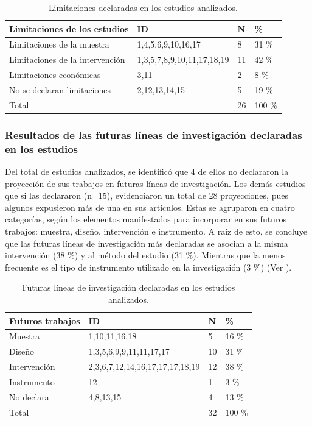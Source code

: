 \documentclass[spanish]{textolivre}
\begin{document}
\begin{table}[htbp]
\caption{Limitaciones declaradas en los estudios analizados.}
\label{tbl11}
\centering
\begin{tabular}{l l l l}
\toprule 
\textbf{Limitaciones de los estudios} & \textbf{ID} & \textbf{N} & \textbf{\%}
\\
\midrule
Limitaciones de la muestra & 1,4,5,6,9,10,16,17 & 8 & 31 \%
\\
Limitaciones de la intervención & 1,3,5,7,8,9,10,11,17,18,19 & 11 & 42 \%
\\
Limitaciones económicas & 3,11 & 2 & 8 \%
\\
No se declaran limitaciones & 2,12,13,14,15 & 5 & 19 \%
\\
Total & & 26 & 100 \%
\\
\bottomrule
\end{tabular}
\end{table}

\subsubsection{Resultados de las futuras líneas de investigación declaradas en los estudios}\label{sec-format-simple}

Del total de estudios analizados, se identificó que 4 de ellos no declararon la proyección de sus trabajos en futuras líneas de investigación. Los demás estudios que si las declararon (n=15), evidenciaron un total de 28 proyecciones, pues algunos expusieron más de una en sus artículos. Estas se agruparon en cuatro categorías, según los elementos manifestados para incorporar en sus futuros trabajos: muestra, diseño, intervención e instrumento. A raíz de esto, se concluye que las futuras líneas de investigación más declaradas se asocian a la misma intervención (38 \%) y al método del estudio (31 \%). Mientras que la menos frecuente es el tipo de instrumento utilizado en la investigación (3 \%) (Ver ).

\begin{table}[htbp]
\caption{Futuras líneas de investigación declaradas en los estudios analizados.}
\label{tbl12}
\centering
\begin{tabular}{l l l l}
\toprule 
\textbf{Futuros trabajos} & \textbf{ID} & \textbf{N} & \textbf{\%}
\\
\midrule
Muestra & 1,10,11,16,18 & 5 &16 \%
\\
Diseño & 1,3,5,6,9,9,11,11,17,17 & 10 & 31 \%
\\
Intervención & 2,3,6,7,12,14,16,17,17,17,18,19 & 12 & 38 \%
\\
Instrumento & 12 & 1 & 3 \%
\\
No declara & 4,8,13,15 & 4 & 13 \%
\\
Total & & 32 & 100 \%
\\
\bottomrule
\end{tabular}
\end{table}
\end{document}
